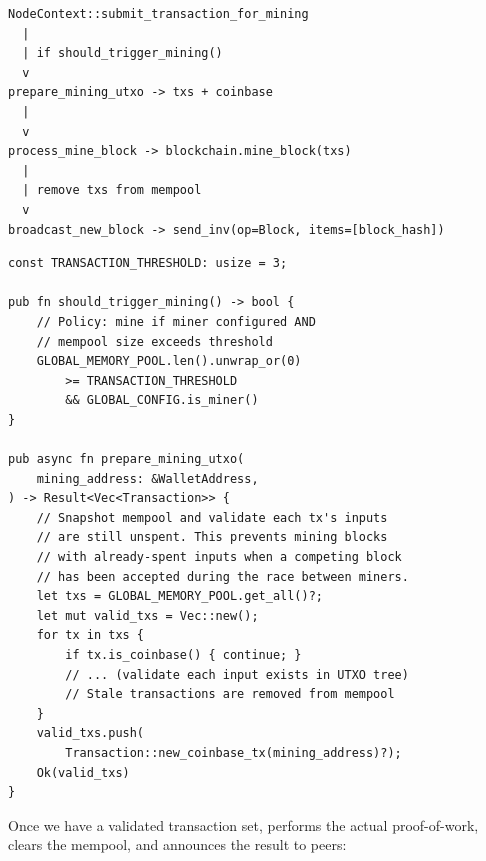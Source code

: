 \begin{verbatim}
NodeContext::submit_transaction_for_mining
  |
  | if should_trigger_mining()
  v
prepare_mining_utxo -> txs + coinbase
  |
  v
process_mine_block -> blockchain.mine_block(txs)
  |
  | remove txs from mempool
  v
broadcast_new_block -> send_inv(op=Block, items=[block_hash])
\end{verbatim}

\begin{listing}[htbp]
\caption{Mining trigger and block construction}
\label{lst:ch13-mining-trigger}
\begin{verbatim}
const TRANSACTION_THRESHOLD: usize = 3;

pub fn should_trigger_mining() -> bool {
    // Policy: mine if miner configured AND
    // mempool size exceeds threshold
    GLOBAL_MEMORY_POOL.len().unwrap_or(0)
        >= TRANSACTION_THRESHOLD
        && GLOBAL_CONFIG.is_miner()
}

pub async fn prepare_mining_utxo(
    mining_address: &WalletAddress,
) -> Result<Vec<Transaction>> {
    // Snapshot mempool and validate each tx's inputs
    // are still unspent. This prevents mining blocks
    // with already-spent inputs when a competing block
    // has been accepted during the race between miners.
    let txs = GLOBAL_MEMORY_POOL.get_all()?;
    let mut valid_txs = Vec::new();
    for tx in txs {
        if tx.is_coinbase() { continue; }
        // ... (validate each input exists in UTXO tree)
        // Stale transactions are removed from mempool
    }
    valid_txs.push(
        Transaction::new_coinbase_tx(mining_address)?);
    Ok(valid_txs)
}
\end{verbatim}
\end{listing}

Once we have a validated transaction set,  performs the actual proof-of-work, clears the mempool, and announces the result to peers:

